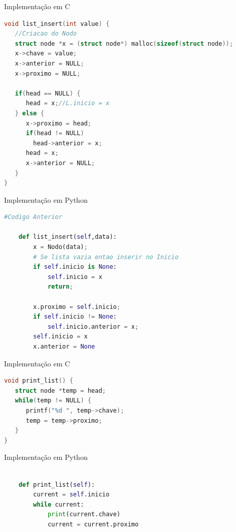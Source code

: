 \documentclass{beamer}
\begin{document}
\begin{frame}[fragile]{Implementação em C}

\centering\footnotesize
\begin{lstlisting}[language=C]
void list_insert(int value) {
   //Criacao do Nodo
   struct node *x = (struct node*) malloc(sizeof(struct node));
   x->chave = value;
   x->anterior = NULL;
   x->proximo = NULL;

   if(head == NULL) {
      head = x;//L.inicio = x
   } else {
      x->proximo = head;
      if(head != NULL)
        head->anterior = x;
      head = x;
      x->anterior = NULL;
   }
}

\end{lstlisting}
\end{frame}

\begin{frame}[fragile]{Implementação em Python}

\begin{lstlisting}[language=Python]
    #Codigo Anterior

    def list_insert(self,data):
        x = Nodo(data);
        # Se lista vazia entao inserir no Inicio
        if self.inicio is None:
            self.inicio = x
            return;

        x.proximo = self.inicio;
        if self.inicio != None:
            self.inicio.anterior = x;
        self.inicio = x
        x.anterior = None

\end{lstlisting}
\end{frame}


\begin{frame}[fragile]{Implementação em C}

\centering\footnotesize
\begin{lstlisting}[language=C]
void print_list() {
   struct node *temp = head;
   while(temp != NULL) {
      printf("%d ", temp->chave);
      temp = temp->proximo;
   }
}

\end{lstlisting}
\end{frame}


\begin{frame}[fragile]{Implementação em Python}

\centering\footnotesize
\begin{lstlisting}[language=Python]

    def print_list(self):
        current = self.inicio
        while current:
            print(current.chave)
            current = current.proximo



\end{lstlisting}
\end{frame}
\end{document}
